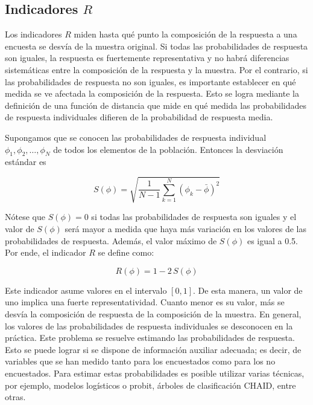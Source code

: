 \documentclass[
  10pt,
  spanish,
]{book}
\begin{document}
\hypertarget{indicadores-r}{%
\subsection{\texorpdfstring{Indicadores \(R\)}{Indicadores R}}\label{indicadores-r}}

Los indicadores \(R\) miden hasta qué punto la composición de
la respuesta a una encuesta se desvía de la muestra original. Si todas las probabilidades de respuesta son iguales, la respuesta
es fuertemente representativa y no habrá diferencias sistemáticas
entre la composición de la respuesta y la muestra. Por el contrario, si las probabilidades de respuesta no son iguales, es importante
establecer en qué medida se ve afectada la composición de la respuesta. Esto se logra mediante la definición de una función de distancia
que mide en qué medida las probabilidades de respuesta individuales
difieren de la probabilidad de respuesta media.

Supongamos que se conocen las probabilidades de respuesta individual
\(\phi_{1},\phi_{2},\ldots,\phi_{N}\) de todos los elementos de la población.
Entonces la desviación estándar es

\[
S\left(\phi\right)  =  \sqrt{\frac{1}{N-1}\sum_{k=1}^{N}\left(\phi_{k}-\bar{\phi}\right)^{2}}
\]

Nótese que \(S\left(\phi\right)=0\) si todas las probabilidades de respuesta
son iguales y el valor de \(S\left(\phi\right)\) será mayor a medida
que haya más variación en los valores de las probabilidades de respuesta. Además, el valor máximo de \(S\left(\phi\right)\) es igual a 0.5. Por ende, el indicador \(R\) se define como:

\[
R\left(\phi\right)=1-2\,S\left(\phi\right)
\]

Este indicador asume valores en el intervalo \(\left[0,1\right]\). De esta manera, un valor de uno implica una fuerte representatividad. Cuanto menor es su valor, más se desvía la composición de respuesta
de la composición de la muestra. En general, los valores de las probabilidades de respuesta individuales se desconocen en la práctica. Este problema se resuelve estimando las probabilidades de respuesta. Esto se puede lograr si se dispone de información auxiliar adecuada; es decir, de variables que se han medido tanto para los encuestados como para los no encuestados. Para estimar estas probabilidades es posible utilizar varias técnicas, por ejemplo, modelos logísticos o probit, árboles de clasificación CHAID, entre otras.
\end{document}
